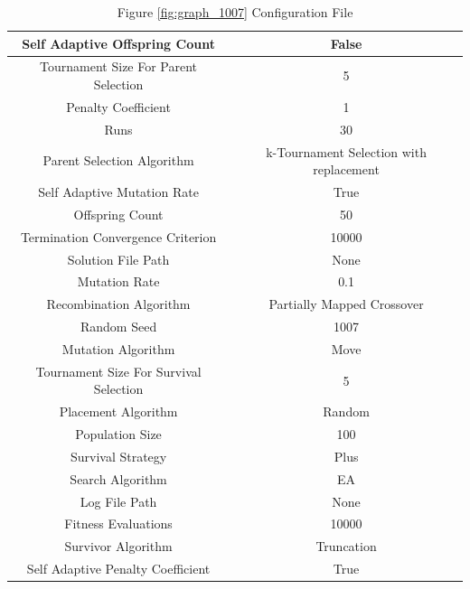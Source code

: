 \documentclass{standalone}
\begin{document}
\begin{table}[!htb]
	\centering
	\caption{Figure \ref{fig:graph_1007} Configuration File}
	\label{tab:graph_1007}
	\begin{tabular}{| c | c |}
		\hline
		Self Adaptive Offspring Count		& False		 \\
		\hline
		Tournament Size For Parent Selection		& 5		 \\
		\hline
		Penalty Coefficient		& 1		 \\
		\hline
		Runs		& 30		 \\
		\hline
		Parent Selection Algorithm		& k-Tournament Selection with replacement		 \\
		\hline
		Self Adaptive Mutation Rate		& True		 \\
		\hline
		Offspring Count		& 50		 \\
		\hline
		Termination Convergence Criterion		& 10000		 \\
		\hline
		Solution File Path		& None		 \\
		\hline
		Mutation Rate		& 0.1		 \\
		\hline
		Recombination Algorithm		& Partially Mapped Crossover		 \\
		\hline
		Random Seed		& 1007		 \\
		\hline
		Mutation Algorithm		& Move		 \\
		\hline
		Tournament Size For Survival Selection		& 5		 \\
		\hline
		Placement Algorithm		& Random		 \\
		\hline
		Population Size		& 100		 \\
		\hline
		Survival Strategy		& Plus		 \\
		\hline
		Search Algorithm		& EA		 \\
		\hline
		Log File Path		& None		 \\
		\hline
		Fitness Evaluations		& 10000		 \\
		\hline
		Survivor Algorithm		& Truncation		 \\
		\hline
		Self Adaptive Penalty Coefficient		& True		 \\
		\hline
	\end{tabular}
\end{table}
\end{document}
